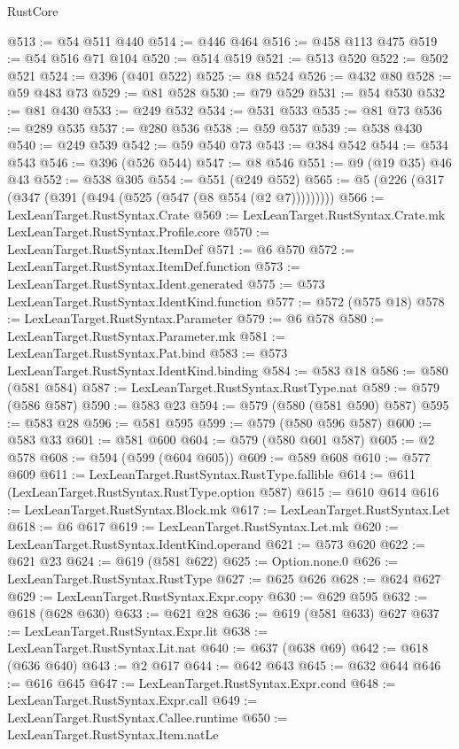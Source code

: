 \begin{lexlean}{RustCore}
\begin{coremodule}
@513 := @54 @511 @440
@514 := @446 @464
@516 := @458 @113 @475
@519 := @54 @516 @71 @104
@520 := @514 @519
@521 := @513 @520
@522 := @502 @521
@524 := @396 (@401 @522)
@525 := @8 @524
@526 := @432 @80
@528 := @59 @483 @73
@529 := @81 @528
@530 := @79 @529
@531 := @54 @530
@532 := @81 @430
@533 := @249 @532
@534 := @531 @533
@535 := @81 @73
@536 := @289 @535
@537 := @280 @536
@538 := @59 @537
@539 := @538 @430
@540 := @249 @539
@542 := @59 @540 @73
@543 := @384 @542
@544 := @534 @543
@546 := @396 (@526 @544)
@547 := @8 @546
@551 := @9 (@19 @35) @46 @43
@552 := @538 @305
@554 := @551 (@249 @552)
@565 := @5 (@226 (@317 (@347 (@391 (@494 (@525 (@547 (@8 @554 (@2 @7)))))))))
@566 := LexLeanTarget.RustSyntax.Crate
@569 := LexLeanTarget.RustSyntax.Crate.mk LexLeanTarget.RustSyntax.Profile.core
@570 := LexLeanTarget.RustSyntax.ItemDef
@571 := @6 @570
@572 := LexLeanTarget.RustSyntax.ItemDef.function
@573 := LexLeanTarget.RustSyntax.Ident.generated
@575 := @573 LexLeanTarget.RustSyntax.IdentKind.function
@577 := @572 (@575 @18)
@578 := LexLeanTarget.RustSyntax.Parameter
@579 := @6 @578
@580 := LexLeanTarget.RustSyntax.Parameter.mk
@581 := LexLeanTarget.RustSyntax.Pat.bind
@583 := @573 LexLeanTarget.RustSyntax.IdentKind.binding
@584 := @583 @18
@586 := @580 (@581 @584)
@587 := LexLeanTarget.RustSyntax.RustType.nat
@589 := @579 (@586 @587)
@590 := @583 @23
@594 := @579 (@580 (@581 @590) @587)
@595 := @583 @28
@596 := @581 @595
@599 := @579 (@580 @596 @587)
@600 := @583 @33
@601 := @581 @600
@604 := @579 (@580 @601 @587)
@605 := @2 @578
@608 := @594 (@599 (@604 @605))
@609 := @589 @608
@610 := @577 @609
@611 := LexLeanTarget.RustSyntax.RustType.fallible
@614 := @611 (LexLeanTarget.RustSyntax.RustType.option @587)
@615 := @610 @614
@616 := LexLeanTarget.RustSyntax.Block.mk
@617 := LexLeanTarget.RustSyntax.Let
@618 := @6 @617
@619 := LexLeanTarget.RustSyntax.Let.mk
@620 := LexLeanTarget.RustSyntax.IdentKind.operand
@621 := @573 @620
@622 := @621 @23
@624 := @619 (@581 @622)
@625 := Option.none.{0}
@626 := LexLeanTarget.RustSyntax.RustType
@627 := @625 @626
@628 := @624 @627
@629 := LexLeanTarget.RustSyntax.Expr.copy
@630 := @629 @595
@632 := @618 (@628 @630)
@633 := @621 @28
@636 := @619 (@581 @633) @627
@637 := LexLeanTarget.RustSyntax.Expr.lit
@638 := LexLeanTarget.RustSyntax.Lit.nat
@640 := @637 (@638 @69)
@642 := @618 (@636 @640)
@643 := @2 @617
@644 := @642 @643
@645 := @632 @644
@646 := @616 @645
@647 := LexLeanTarget.RustSyntax.Expr.cond
@648 := LexLeanTarget.RustSyntax.Expr.call
@649 := LexLeanTarget.RustSyntax.Callee.runtime
@650 := LexLeanTarget.RustSyntax.Item.natLe

\end{coremodule}
\end{lexlean}
